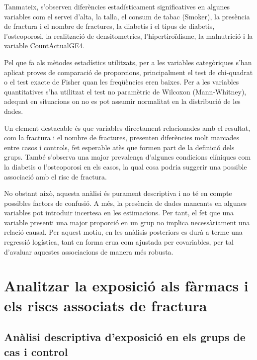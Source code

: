 \documentclass[
]{article}
\begin{document}
Tanmateix, s'observen diferències estadísticament significatives en
algunes variables com el servei d'alta, la talla, el consum de tabac
(Smoker), la presència de fractura i el nombre de fractures, la diabetis
i el tipus de diabetis, l'osteoporosi, la realització de densitometries,
l'hipertiroïdisme, la malnutrició i la variable CountActualGE4.

Pel que fa als mètodes estadístics utilitzats, per a les variables
categòriques s'han aplicat proves de comparació de proporcions,
principalment el test de chi-quadrat o el test exacte de Fisher quan les
freqüències eren baixes. Per a les variables quantitatives s'ha
utilitzat el test no paramètric de Wilcoxon (Mann-Whitney), adequat en
situacions on no es pot assumir normalitat en la distribució de les
dades.

Un element destacable és que variables directament relacionades amb el
resultat, com la fractura i el nombre de fractures, presenten
diferències molt marcades entre casos i controls, fet esperable atès que
formen part de la definició dels grups. També s'observa una major
prevalença d'algunes condicions clíniques com la diabetis o
l'osteoporosi en els casos, la qual cosa podria suggerir una possible
associació amb el risc de fractura.

No obstant això, aquesta anàlisi és purament descriptiva i no té en
compte possibles factors de confusió. A més, la presència de dades
mancants en algunes variables pot introduir incertesa en les
estimacions. Per tant, el fet que una variable presenti una major
proporció en un grup no implica necessàriament una relació causal. Per
aquest motiu, en les anàlisis posteriors es durà a terme una regressió
logística, tant en forma crua com ajustada per covariables, per tal
d'avaluar aquestes associacions de manera més robusta.

\clearpage

\section{Analitzar la exposició als fàrmacs i els riscs associats de
fractura}\label{analitzar-la-exposiciuxf3-als-fuxe0rmacs-i-els-riscs-associats-de-fractura}

\subsection{Anàlisi descriptiva d'exposició en els grups de cas i
control}\label{anuxe0lisi-descriptiva-dexposiciuxf3-en-els-grups-de-cas-i-control}
\end{document}
